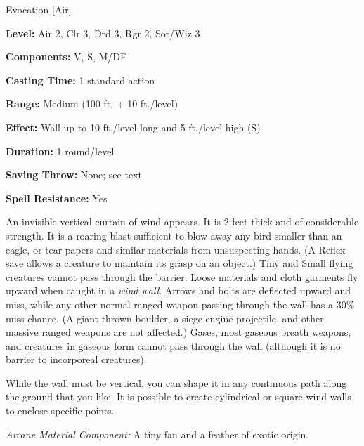 
Evocation [Air]

\textbf{Level:} Air 2, Clr 3, Drd 3, Rgr 2, Sor/Wiz 3

\textbf{Components:} V, S, M/DF

\textbf{Casting Time:} 1 standard action

\textbf{Range:} Medium (100 ft. + 10 ft./level)

\textbf{Effect:} Wall up to 10 ft./level long and 5 ft./level high (S)

\textbf{Duration:} 1 round/level

\textbf{Saving Throw:} None; see text

\textbf{Spell Resistance:} Yes

An invisible vertical curtain of wind appears. It is 2 feet thick and of considerable 
strength. It is a roaring blast sufficient to blow away any bird smaller than an 
eagle, or tear papers and similar materials from unsuspecting hands. (A Reflex 
save allows a creature to maintain its grasp on an object.) Tiny and Small flying 
creatures cannot pass through the barrier. Loose materials and cloth garments fly 
upward when caught in a \textit{wind wall}. Arrows and bolts are deflected upward 
and miss, while any other normal ranged weapon passing through the wall has a 30\% 
miss chance. (A giant-thrown boulder, a siege engine projectile, and other massive 
ranged weapons are not affected.) Gases, most gaseous breath weapons, and creatures 
in gaseous form cannot pass through the wall (although it is no barrier to incorporeal 
creatures).

While the wall must be vertical, you can shape it in any continuous path along 
the ground that you like. It is possible to create cylindrical or square wind walls 
to enclose specific points. 

\textit{Arcane Material Component:} A tiny fan and a feather of exotic origin.


